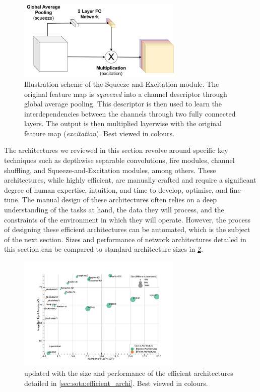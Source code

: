 
\begin{figure}[htbp]
  \centering
  \includegraphics[width=0.70\textwidth]{chapter_sota/assets/SE_module.pdf}
  \caption{Illustration scheme of the Squeeze-and-Excitation module. The
    original feature map is \emph{squeezed} into a channel descriptor through
    global average pooling. This descriptor is then used to learn the
    interdependencies between the channels through two fully connected layers.
    The output is then multiplied layerwise with the original feature map
    (\emph{excitation}). Best viewed in colours.}
  \label{fig:sota:se_module}
\end{figure}


The architectures we reviewed in this section revolve around specific key
techniques such as depthwise separable convolutions, fire modules, channel
shuffling, and Squeeze-and-Excitation modules, among others. These
architectures, while highly efficient, are manually crafted and require a
significant degree of human expertise, intuition, and time to develop, optimise,
and fine-tune. The manual design of these architectures often relies on a deep
understanding of the tasks at hand, the data they will process, and the
constraints of the environment in which they will operate. However, the process
of designing these efficient architectures can be automated, which is the
subject of the next section. Sizes and performance of network architectures
detailed in this section can be compared to standard architecture sizes in
\cref{fig:sota:net_sizes_std_eff}.\\

\begin{figure}[htbp]
  \centering
  \includegraphics[width=0.70\textwidth]{chapter_sota/assets/network_sizes_normal_eff.pdf}
  \caption{ updated with the size and performance of the
    efficient architectures detailed in \cref{sec:sota:efficient_archi}. Best
    viewed in colours.}
  \label{fig:sota:net_sizes_std_eff}
\end{figure}




